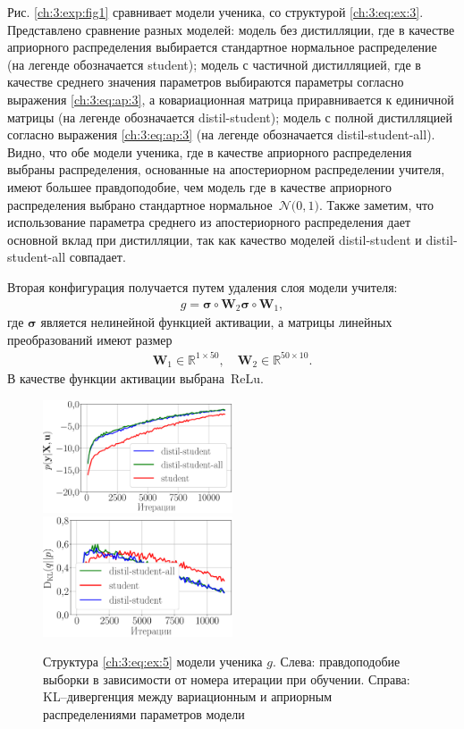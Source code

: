 Рис. \ref{ch:3:exp:fig1} сравнивает модели ученика, со структурой \eqref{ch:3:eq:ex:3}. Представлено сравнение разных моделей: модель без дистилляции, где в качестве априорного распределения выбирается стандартное нормальное распределение (на легенде обозначается student); модель с частичной дистилляцией, где в качестве среднего значения параметров выбираются параметры согласно выражения \eqref{ch:3:eq:ap:3}, а ковариационная матрица приравнивается к единичной матрицы (на легенде обозначается distil-student); модель с полной дистилляцией согласно выражения \eqref{ch:3:eq:ap:3} (на легенде обозначается distil-student-all). Видно, что обе модели ученика, где в качестве априорного распределения выбраны распределения, основанные на апостериорном распределении учителя, имеют большее правдоподобие, чем модель где в качестве априорного распределения выбрано стандартное нормальное~$\mathcal{N}\bigr(0,1\bigr)$. Также заметим, что использование параметра среднего из апостериорного распределения дает основной вклад при дистилляции, так как качество моделей distil-student и distil-student-all совпадает.

Вторая конфигурация получается путем удаления слоя модели учителя:
\[
\label{ch:3:eq:ex:5}
\begin{aligned}
g = \bm{\sigma} \circ \mathbf{W}_2\bm{\sigma} \circ \mathbf{W}_1,
\end{aligned}
\]
где $\bm{\sigma}$ является нелинейной функцией активации, а матрицы линейных преобразований имеют размер
\[
\label{ch:3:eq:ex:6}
\begin{aligned}
\mathbf{W}_{1} \in \mathbb{R}^{1 \times 50}, \quad \mathbf{W}_{2} \in \mathbb{R}^{50 \times 10}.
\end{aligned}
\]
В качестве функции активации выбрана~$\text{ReLu}$.

\begin{figure}[!ht]
\includegraphics[width=0.5\textwidth]{results/bayesdistil/synthetic_likelihood_2_layers.eps}
\includegraphics[width=0.5\textwidth]{results/bayesdistil/synthetic_D_KL_2_layers.eps}
\caption{Структура \eqref{ch:3:eq:ex:5} модели ученика $g$. Слева: правдоподобие выборки в зависимости от номера итерации при обучении. Справа: KL--дивергенция между вариационным и априорным распределениями параметров модели}
\label{ch:3:exp:fig2}
\end{figure}

